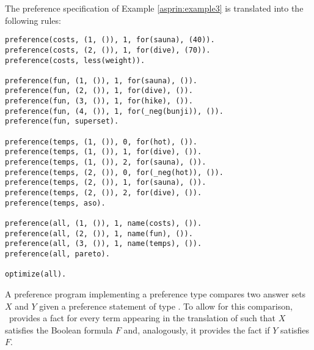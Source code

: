 \begin{example}
The preference specification of Example \ref{asprin:example3} is translated into the following rules:
\begin{lstlisting}[numbers=none,escapechar=?]
preference(costs, (1, ()), 1, for(sauna), (40)).
preference(costs, (2, ()), 1, for(dive), (70)).
preference(costs, less(weight)).

preference(fun, (1, ()), 1, for(sauna), ()).
preference(fun, (2, ()), 1, for(dive), ()).
preference(fun, (3, ()), 1, for(hike), ()).
preference(fun, (4, ()), 1, for(_neg(bunji)), ()).
preference(fun, superset).

preference(temps, (1, ()), 0, for(hot), ()).
preference(temps, (1, ()), 1, for(dive), ()).
preference(temps, (1, ()), 2, for(sauna), ()).
preference(temps, (2, ()), 0, for(_neg(hot)), ()).
preference(temps, (2, ()), 1, for(sauna), ()).
preference(temps, (2, ()), 2, for(dive), ()).
preference(temps, aso).

preference(all, (1, ()), 1, name(costs), ()).
preference(all, (2, ()), 1, name(fun), ()).
preference(all, (3, ()), 1, name(temps), ()).
preference(all, pareto).

optimize(all).
\end{lstlisting}
\end{example}


A preference program implementing a preference type 
compares two answer sets $X$ and $Y$
given a preference statement  of type . %
To allow for this comparison, 
\asprin\ 
provides a fact  
for every term  appearing in the translation of  
such that $X$ satisfies the Boolean formula $F$ 
and, analogously, it provides the fact  if $Y$ satisfies $F$.

